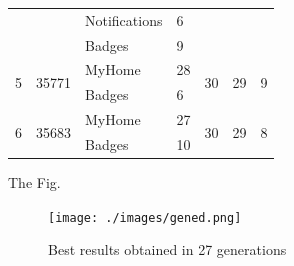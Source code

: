 \begin{table}[h]
\begin{tabular}{|l|l|l|l|l|l|l|}
                   &                        & Notifications & 6               &                     &                     &                     \\ \cline{3-4}
                   &                        & Badges        & 9               &                     &                     &                     \\ \hline
\multirow{2}{*}{5} & \multirow{2}{*}{35771} & MyHome        & 28              & \multirow{2}{*}{30} & \multirow{2}{*}{29} & \multirow{2}{*}{9}  \\ \cline{3-4}
                   &                        & Badges        & 6               &                     &                     &                     \\ \hline
\multirow{2}{*}{6} & \multirow{2}{*}{35683} & MyHome        & 27              & \multirow{2}{*}{30} & \multirow{2}{*}{29} & \multirow{2}{*}{8}  \\ \cline{3-4}
                   &                        & Badges        & 10              &                     &                     &                     \\ \hline
\end{tabular}
\end{table}


The Fig.

\begin{figure}[h]
\centering
\caption{Best results obtained in 27 generations}
\texttt{[image: ./images/gened.png]}
\label{fig:exp1bestresults}
\end{figure}

 